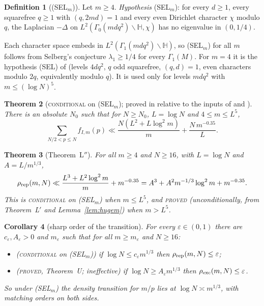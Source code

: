 \documentclass[10pt,reqno]{amsart}
\newtheorem{theorem}{Theorem}[section]
\newtheorem{corollary}[theorem]{Corollary}
\theoremstyle{definition}
\newtheorem{definition}[theorem]{Definition}
\newcommand{\status}[1]{\textup{\textsc{#1}}}
\begin{document}
\begin{definition}[(SEL$_m$)]\label{def:sel}
Let $m\geq4$.  \emph{Hypothesis} (SEL$_m$): for every $d\geq1$, every
squarefree $q\geq1$ with $(q,2md)=1$ and every even Dirichlet character
$\chi$ modulo $q$, the Laplacian $-\Delta$ on
$L^2(\Gamma_0(mdq^2)\backslash\mathbb H,\chi)$ has no eigenvalue in
$(0,1/4)$.
\end{definition}
Each character space embeds in $L^2(\Gamma_1(mdq^2)\backslash\mathbb H)$, so
(SEL$_m$) for all $m$ follows from Selberg's conjecture $\lambda_1\geq1/4$
for every $\Gamma_1(M)$.  For $m=4$ it is the hypothesis (SEL) of
\cite[Hyp.~1.1]{HN} (levels $4dq^2$, $q$ odd squarefree, $(q,d)=1$, even
characters modulo $2q$, equivalently modulo $q$).  It is used only for
levels $mdq^2$ with $m\leq(\log N)^5$.

\begin{theorem}[\status{conditional} on (SEL$_m$); proved in \cite{MN4} relative to the inputs of {\cite[Thm.~8.2]{HN}} and \cite{MN3}]\label{thm:selI} %
There is an absolute $N_0$ such that for $N\geq N_0$, $L=\log N$ and
$4\leq m\leq L^5$,
\[
 \sum_{N/2<p\leq N}f_{I,m}(p)\ll\frac{N(L^2+L\log^2m)}m+\frac{N\,m^{-0.35}}L .
\]
\end{theorem}

\begin{theorem}[Theorem~L$''$]\label{thm:selL}
For all $m\geq4$ and $N\geq16$, with $L=\log N$ and $A=L/m^{1/3}$,
\[
 \rho_{\rm rep}(m,N)\ll\frac{L^3+L^2\log^2m}m+m^{-0.35}
 =A^3+A^2m^{-1/3}\log^2m+m^{-0.35}.
\]
This is \status{conditional} on (SEL$_m$) when $m\leq L^5$, and
\status{proved} \textup{(}unconditionally, from Theorem~L$'$ and
Lemma~\ref{lem:hugem}\textup{)} when $m>L^5$.
\end{theorem}

\begin{corollary}[sharp order of the transition]\label{cor:sharp}
For every $\varepsilon\in(0,1)$ there are $c_\varepsilon,A_\varepsilon>0$ and
$m_\varepsilon$ such that for all $m\geq m_\varepsilon$ and $N\geq16$:
\begin{itemize}
\item[(a)] \textup{(}\status{conditional} on (SEL$_m$)\textup{)} if
$\log N\leq c_\varepsilon m^{1/3}$ then $\rho_{\rm rep}(m,N)\leq\varepsilon$;
\item[(b)] \textup{(}\status{proved}, Theorem~U; ineffective\textup{)} if
$\log N\geq A_\varepsilon m^{1/3}$ then $\rho_{\rm exc}(m,N)\leq\varepsilon$.
\end{itemize}
So under (SEL$_m$) the density transition for $m/p$ lies at
$\log N\asymp m^{1/3}$, with matching orders on both sides.
\end{corollary}
\end{document}
